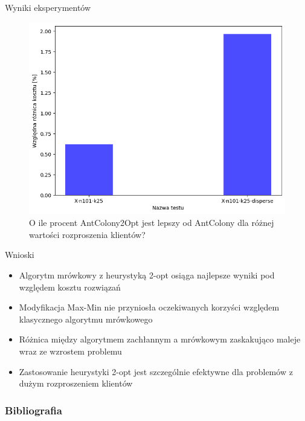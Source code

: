 \documentclass{beamer}
\begin{document}
\begin{frame}{Wyniki eksperymentów}
    \begin{figure}
        \centering
        \includegraphics[width=0.7\linewidth]{../report/img/disperse.png}
        \caption{O ile procent AntColony2Opt jest lepszy od AntColony dla różnej wartości rozproszenia klientów?}
    \end{figure}        
\end{frame}

\begin{frame}{Wnioski}
    \begin{itemize}
        \setlength\itemsep{1em}
        \item Algorytm mrówkowy z heurystyką 2-opt osiąga najlepsze wyniki pod względem kosztu rozwiązań
        \item Modyfikacja Max-Min nie przyniosła oczekiwanych korzyści względem klasycznego algorytmu mrówkowego
        \item Różnica między algorytmem zachłannym a mrówkowym zaskakująco maleje wraz ze wzrostem problemu
        \item Zastosowanie heurystyki 2-opt jest szczególnie efektywne dla problemów z dużym rozproszeniem klientów
    \end{itemize}
\end{frame}

\begin{frame}[allowframebreaks]
    \frametitle{Bibliografia}
    \nocite{*}
    
    
\end{frame}
\end{document}
